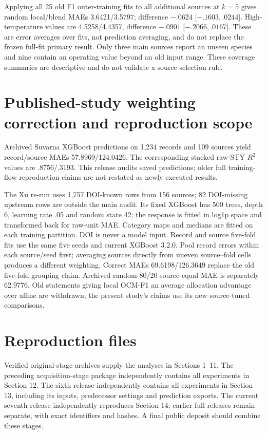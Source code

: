 \documentclass[11pt]{article}
\begin{document}
Applying all 25 old F1 outer-training fits to all additional sources at $k=5$ gives random local/blend MAEs 3.6421/3.5797; difference $-.0624$ [$-.1603,.0244$]. High-temperature values are 4.5258/4.4357, difference $-.0901$ [$-.2066,.0167$]. These are error averages over fits, not prediction averaging, and do not replace the frozen full-fit primary result. Only three main sources report an unseen species and nine contain an operating value beyond an old input range. These coverage summaries are descriptive and do not validate a source selection rule.

\section{Published-study weighting correction and reproduction scope}
Archived Suvarna XGBoost predictions on 1,234 records and 109 sources yield record/source MAEs 57.8969/124.0426. The corresponding stacked raw-STY $R^2$ values are .8756/.3193. This release audits saved predictions; older full training-flow reproduction claims are not restated as newly executed results.

The Xu re-run uses 1,757 DOI-known rows from 156 sources; 82 DOI-missing upstream rows are outside the main audit. Its fixed XGBoost has 500 trees, depth 6, learning rate .05 and random state 42; the response is fitted in log1p space and transformed back for raw-unit MAE. Category maps and medians are fitted on each training partition. DOI is never a model input. Record and source five-fold fits use the same five seeds and current XGBoost 3.2.0. Pool record errors within each source/seed first; averaging sources directly from uneven source--fold cells produces a different weighting. Correct MAEs 69.6198/126.3649 replace the old five-fold grouping claim. Archived random-80/20 source-equal MAE is separately 62.9776. Old statements giving local OCM-F1 an average allocation advantage over affine are withdrawn; the present study's claims use its new source-tuned comparisons.

\section{Reproduction files}
Verified original-stage archives supply the analyses in Sections 1--11. The preceding acquisition-stage package independently contains all experiments in Section 12. The sixth release independently contains all experiments in Section 13, including its inputs, predecessor settings and prediction exports. The current seventh release independently reproduces Section 14; earlier full releases remain separate, with exact identifiers and hashes. A final public deposit should combine these stages.
\end{document}
